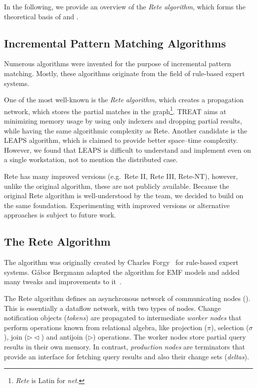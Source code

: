 In the following, we provide an overview of the \emph{Rete algorithm}, which forms the theoretical basis of \eiq{} and \iqd{}.

\subsection{Incremental Pattern Matching Algorithms}

Numerous algorithms were invented for the purpose of incremental pattern matching. Mostly, these algorithms originate from the field of rule-based expert systems.

One of the most well-known is the \emph{Rete algorithm}, which creates a propagation network, which stores the partial matches in the graph\footnote{\emph{Rete} is Latin for \emph{net}.}. TREAT \cite{Miranker:1991:OPT:627280.627434} aims at minimizing memory usage by using only indexers and dropping partial results, while having the same algorithmic complexity as Rete. Another candidate is the LEAPS \cite{Batory:1994:LA:899216} algorithm, which is claimed to provide better space--time complexity. However, we found that LEAPS is difficult to understand and implement even on a single workstation, not to mention the distributed case. 

Rete has many improved versions (e.g.\ Rete II, Rete III, Rete-NT), however, unlike the original algorithm, these are not publicly available. Because the original Rete algorithm is well-understood by the \eiq{} team, we decided to build \iqd{} on the same foundation. Experimenting with improved versions or alternative approaches is subject to future work.

\subsection{The Rete Algorithm}
\label{rete}

The algorithm was originally created by Charles Forgy~\cite{Forgy} for rule-based expert systems. Gábor Bergmann  adapted the algorithm for EMF models and added many tweaks and improvements to it~\cite{BergmannMasters}.


The Rete algorithm defines an asynchronous network of communicating nodes (). This is essentially a dataflow network, with two types of nodes. Change notification objects (\emph{tokens}) are propagated to intermediate \emph{worker nodes} that perform operations known from relational algebra, like projection ($ \pi $), selection ($ \sigma $),  join ($ \rhd\!\!\lhd $) and antijoin ($ \rhd $) operations. The worker nodes store partial query results in their own memory. In contrast, \emph{production nodes} are terminators that provide an interface for fetching query results and also their change sets (\emph{deltas}).

